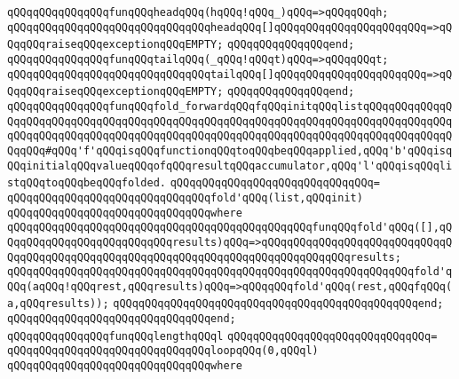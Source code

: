 \newline
\verb|qQQqqQQqqQQqqQQqfunqQQqheadqQQq(hqQQq!qQQq_)qQQq=>qQQqqQQqh;|\newline
\verb|qQQqqQQqqQQqqQQqqQQqqQQqqQQqqQQqheadqQQq[]qQQqqQQqqQQqqQQqqQQqqQQq=>qQQqqQQqraiseqQQqexceptionqQQqEMPTY;|\newline
\verb|qQQqqQQqqQQqqQQqend;|\newline
\newline
\verb|qQQqqQQqqQQqqQQqfunqQQqtailqQQq(_qQQq!qQQqt)qQQq=>qQQqqQQqt;|\newline
\verb|qQQqqQQqqQQqqQQqqQQqqQQqqQQqqQQqtailqQQq[]qQQqqQQqqQQqqQQqqQQqqQQq=>qQQqqQQqraiseqQQqexceptionqQQqEMPTY;|\newline
\verb|qQQqqQQqqQQqqQQqend;|\newline
\newline
\verb|qQQqqQQqqQQqqQQqfunqQQqfold_forwardqQQqfqQQqinitqQQqlistqQQqqQQqqQQqqQQqqQQqqQQqqQQqqQQqqQQqqQQqqQQqqQQqqQQqqQQqqQQqqQQqqQQqqQQqqQQqqQQqqQQqqQQqqQQqqQQqqQQqqQQqqQQqqQQqqQQqqQQqqQQqqQQqqQQqqQQqqQQqqQQqqQQqqQQqqQQqqQQq#qQQq'f'qQQqisqQQqfunctionqQQqtoqQQqbeqQQqapplied,qQQq'b'qQQqisqQQqinitialqQQqvalueqQQqofqQQqresultqQQqaccumulator,qQQq'l'qQQqisqQQqlistqQQqtoqQQqbeqQQqfolded.|\newline
\verb|qQQqqQQqqQQqqQQqqQQqqQQqqQQqqQQq=|\newline
\verb|qQQqqQQqqQQqqQQqqQQqqQQqqQQqqQQqfold'qQQq(list,qQQqinit)|\newline
\verb|qQQqqQQqqQQqqQQqqQQqqQQqqQQqqQQqwhere|\newline
\verb|qQQqqQQqqQQqqQQqqQQqqQQqqQQqqQQqqQQqqQQqqQQqqQQqfunqQQqfold'qQQq([],qQQqqQQqqQQqqQQqqQQqqQQqqQQqresults)qQQq=>qQQqqQQqqQQqqQQqqQQqqQQqqQQqqQQqqQQqqQQqqQQqqQQqqQQqqQQqqQQqqQQqqQQqqQQqqQQqqQQqqQQqresults;|\newline
\verb|qQQqqQQqqQQqqQQqqQQqqQQqqQQqqQQqqQQqqQQqqQQqqQQqqQQqqQQqqQQqqQQqfold'qQQq(aqQQq!qQQqrest,qQQqresults)qQQq=>qQQqqQQqfold'qQQq(rest,qQQqfqQQq(a,qQQqresults));|\newline
\verb|qQQqqQQqqQQqqQQqqQQqqQQqqQQqqQQqqQQqqQQqqQQqqQQqend;|\newline
\verb|qQQqqQQqqQQqqQQqqQQqqQQqqQQqqQQqend;|\newline
\newline
\verb|qQQqqQQqqQQqqQQqfunqQQqlengthqQQql|\newline
\verb|qQQqqQQqqQQqqQQqqQQqqQQqqQQqqQQq=|\newline
\verb|qQQqqQQqqQQqqQQqqQQqqQQqqQQqqQQqloopqQQq(0,qQQql)|\newline
\verb|qQQqqQQqqQQqqQQqqQQqqQQqqQQqqQQqwhere|\newline

